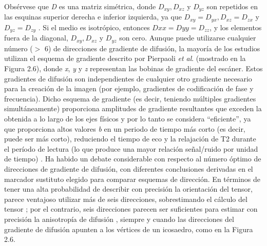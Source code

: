 \documentclass[12pt,a5,twoside]{book}
\begin{document}
Obsérvese que {\it D} es una matriz simétrica, donde $D_{xy}, D_{xz}$ y $D_{yz}$ son repetidos en las esquinas superior derecha e inferior izquierda, ya que $D_{xy} = D_{yx}, D_{xz} = D_{zx}$ y $D_{yz} = D_{zy}$ . Si el medio es isotrópico, entonces $D{xx} = D{yy} = D_{zz}$, y los elementos fuera de la diagonal, $D_{xy}, D_{xz}$ y $D_{yz}$ son cero. Aunque puede utilizarse cualquier número ($>$ 6) de direcciones de gradiente de difusión, la mayoría de los estudios utilizan el esquema de gradiente descrito por Pierpaoli {\it et al}. \citep{Pierpaoli_1996} (mostrado en la Figura 2.6), donde {\it x}, {\it y} y {\it z} representan las bobinas de gradiente del escáner. Estos gradientes de difusión son independientes de cualquier otro gradiente necesario para la creación de la imagen (por ejemplo, gradientes de codificación de fase y frecuencia). Dicho esquema de gradiente (es decir, teniendo múltiples gradientes simultáneamente) proporciona amplitudes de gradiente resultantes que exceden la obtenida a lo largo de los ejes físicos y por lo tanto se considera ``eficiente'', ya que proporciona altos valores {\it b} en un periodo de tiempo más corto (es decir, puede ser más corto), reduciendo el tiempo de eco y la relajación de T2 durante el período de lectura (lo que produce una mayor relación señal/ruido por unidad de tiempo) \citep{Jones_2004}. Ha habido un debate considerable con respecto al número óptimo de direcciones de gradiente de difusión, con diferentes conclusiones derivadas en el marcador sustituto elegido para comparar esquemas de dirección. En términos de tener una alta probabilidad de describir con precisión la orientación del tensor, parece ventajoso utilizar más de seis direcciones, sobrestimando el cálculo del tensor \citep{Jones_2004}; por el contrario, seis direcciones parecen ser suficientes para estimar con precisión la anisotropía de difusión \citep{Hasan_2001}, siempre y cuando las direcciones del gradiente de difusión apunten a los vértices de un icosaedro, como en la Figura 2.6.
\end{document}
